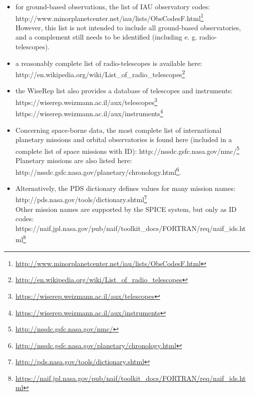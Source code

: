 \documentclass[11pt,a4paper]{ivoa}
\begin{document}
\begin{itemize}

\item for ground-based observations, the list of IAU observatory codes:\\http://www.minorplanetcenter.net/iau/lists/ObsCodesF.html\footnote{\url{http://www.minorplanetcenter.net/iau/lists/ObsCodesF.html}} \\However, this list is not intended to include all ground-based observatories, and a complement still needs to be identified (including e. g. radio-telescopes). 

\item a reasonably complete list of radio-telescopes is available here: \\http://en.wikipedia.org/wiki/List\_of\_radio\_telescopes\footnote{\url{http://en.wikipedia.org/wiki/List_of_radio_telescopes}}

\item the WiseRep list also provides a  database of telescopes and instruments: \\https://wiserep.weizmann.ac.il/aux/telescopes\footnote{\url{https://wiserep.weizmann.ac.il/aux/telescopes}} \\https://wiserep.weizmann.ac.il/aux/instruments\footnote{\url{https://wiserep.weizmann.ac.il/aux/instruments}}

\item Concerning space-borne data, the most complete list of international planetary missions and orbital observatories is found here (included in a complete list of space missions with ID): http://nssdc.gsfc.nasa.gov/nmc/\footnote{\url{http://nssdc.gsfc.nasa.gov/nmc/}}\\Planetary missions are also listed here: http://nssdc.gsfc.nasa.gov/planetary/chronology.html\footnote{\url{http://nssdc.gsfc.nasa.gov/planetary/chronology.html}}. 

\item Alternatively, the PDS dictionary defines values for many mission names: \\http://pds.nasa.gov/tools/dictionary.shtml\footnote{\url{http://pds.nasa.gov/tools/dictionary.shtml}}\\Other mission names are supported by the SPICE system, but only as ID codes: \\https://naif.jpl.nasa.gov/pub/naif/toolkit\_docs/FORTRAN/req/naif\_ids.html\footnote{\url{https://naif.jpl.nasa.gov/pub/naif/toolkit_docs/FORTRAN/req/naif_ids.html}}

\end{itemize}
\end{document}
